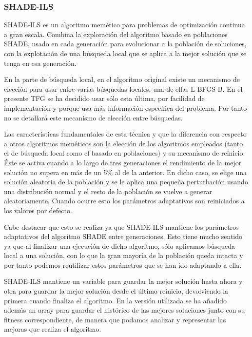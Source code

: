 \subsubsection{SHADE-ILS}
\label{sec:shade-ils}


SHADE-ILS \cite{shadeils} es un algoritmo memético para problemas de optimización continua a gran escala. Combina la exploración del algoritmo basado en poblaciones SHADE, usado en cada generación para evolucionar a la población de soluciones, con la explotación de una búsqueda local que se aplica a la mejor solución que se tenga en esa generación. 

En la parte de búsqueda local, en el algoritmo original existe un mecanismo de elección para usar entre varias búsquedas locales, una de ellas L-BFGS-B. En el presente TFG se ha decidido usar sólo esta última, por facilidad de implementación y porque usa más información específica del problema. Por tanto no se detallará este mecanismo de elección entre búsquedas.

Las características fundamentales de esta técnica y que la diferencia con respecto a otros algoritmos meméticos son la elección de los algoritmos empleados (tanto el de búsqueda local como el basado en poblaciones) y su mecanismo de reinicio. Éste se activa cuando a lo largo de tres generaciones el rendimiento de la mejor solución no supera en más de un 5\% al de la anterior. En dicho caso, se elige una solución aleatoria de la población y se le aplica una pequeña perturbación usando una distribución normal y el resto de la población se vuelve a generar aleatoriamente. Cuando ocurre esto los parámetros adaptativos son reiniciados a los valores por defecto.

Cabe destacar que esto se realiza ya que SHADE-ILS mantiene los parámetros adaptativos del algoritmo SHADE entre generaciones. Esto tiene mucho sentido ya que al finalizar una ejecución de dicho algoritmo, sólo aplicamos búsqueda local a una solución, con lo que la gran mayoría de la población queda intacta y por tanto podemos reutilizar estos parámetros que se han ido adaptando a ella. 

SHADE-ILS mantiene un variable para guardar la mejor solución hasta ahora y otra para guardar la mejor solución desde el último reinicio, devolviendo la primera cuando finaliza el algoritmo. En la versión utilizada se ha añadido además un array para guardar el histórico de las mejores soluciones junto con su fitness correspondiente, de manera que podamos analizar y representar las mejoras que realiza el algoritmo. 


